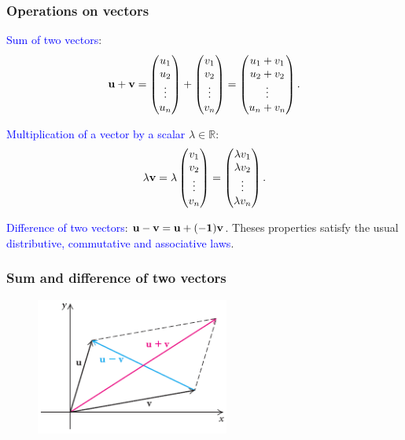 \documentclass[11pt,aspectratio=169]{beamer}
\begin{document}
\begin{frame}
\frametitle{Operations on vectors}
\begin{small}
\textcolor{blue}{Sum of two vectors}:
\begin{equation*}
\bf{u}+\bf{v}=\begin{pmatrix}u_1\\
u_2 \\
\vdots\\
u_n
\end{pmatrix}+
\begin{pmatrix}v_1\\
v_2 \\
\vdots\\
v_n
\end{pmatrix}=\begin{pmatrix}u_1+v_1\\
u_2+v_2 \\
\vdots\\
u_n+v_n
\end{pmatrix}.
\end{equation*}

\textcolor{blue}{Multiplication of a vector by a scalar} $\lambda \in \mathbb{R}$:
\begin{equation*}
\lambda \bf{v}=\lambda\begin{pmatrix}v_1\\
v_2 \\
\vdots\\
v_n
\end{pmatrix}=
\begin{pmatrix} \lambda v_1\\
\lambda v_2 \\
\vdots\\
\lambda v_n
\end{pmatrix}.
\end{equation*}

\textcolor{blue}{Difference of two vectors}: $\bf{u}-\bf{v}=\bf{u}+(-1)\bf{v}$.
\vskip 10pt
Theses properties satisfy the usual \textcolor{blue}{distributive, commutative and associative laws}.


\end{small}
\end{frame}

\begin{frame}
\frametitle{Sum and difference of two vectors}

\begin{figure}
\includegraphics[width=2.5in]{img/sum} 
\end{figure}
\begin{small}
\end{small}
\end{frame}
\end{document}
